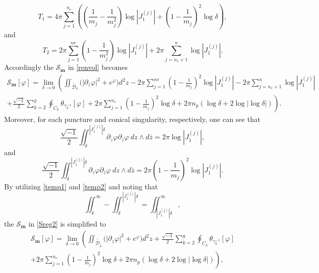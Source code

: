 \documentclass[a4paper,11pt]{article}
\newcommand{\singfund}{\overset{{}_{\curlywedge}}{\mathcal{D}}}
\begin{document}
\begin{equation}
T_1  = 4\pi \sum_{j=1}^{n_e} \left(   (\frac{1}{m_j}-\frac{1}{m_j^2}) \log \left|J_1^{(j)}\right|+   (1-\frac{1}{m_j})^2 \log \delta \right),
\label{bdterm}
\end{equation}
and
\begin{equation}
T_2 = 2\pi \sum_{j=1}^{ne} (1-\frac{1}{m_j^2}) \log\left|J_{1}^{(j)}\right| +2\pi \sum_{j=n_e+1}^{n} \log\left|J_{1}^{(j)}\right|.
\end{equation}
Accordingly the $\mathscr{S}_{\boldsymbol{m}} $ in \eqref{renvol} becomes
\begin{multline}
\mathscr{S}_{\boldsymbol{m}}[\varphi]  = \lim_{\delta \to 0} \left(\iint_{\singfund_{\delta}} \Big(
|\partial_z \varphi|^2 + e^\varphi
\Big) d^2z - 2\pi \sum_{j=1}^{ne} (1-\frac{1}{m_j})^2 \log\left|J_{1}^{(j)}\right| -2\pi \sum_{j=n_e+1}^{n} \log\left|J_{1}^{(j)}\right|\right. \\ \left. + \frac{\sqrt{-1}}{2} \sum_{k=2}^{g} \oint_{C_k} \theta_{\gamma_k^{-1}}[\varphi]+2\pi \sum_{j=1}^{n_e} (1-\frac{1}{m_j})^2 \log \delta + 2\pi n_p \left(
\log\delta + 2\log \left|\log \delta\right|
\right)\right).
\label{Sreg2}
\end{multline}
Moreover, for each puncture and conical singularity, respectively, one can see that
\begin{equation}
\frac{\sqrt{-1}}{2} \iint_{\delta}^{\left|J_{1}^{(j)}\right|\delta} \partial_z \varphi \partial_{\bar{z} }\varphi ~dz\wedge d\bar{z} = 2\pi \log\left|J_{1}^{(j)}\right|,
\label{temp1}
\end{equation}
and
\begin{equation}
\frac{\sqrt{-1}}{2} \iint_{\delta}^{\left|J_{1}^{(j)}\right|\delta} \partial_z \varphi \partial_{\bar{z}}  \varphi ~dz \wedge d\bar{z} =  2\pi (1-\frac{1}{m_j})^2 \log\left|J_{1}^{(j)}\right|.
\label{temp2}
\end{equation}
By utilizing \eqref{temp1} and \eqref{temp2} and noting that
\begin{equation} \iint_{\delta}^{\infty}  -\iint_{\delta}^{\left|J_{1}^{(j)}\right|\delta}=\iint_{\left|J_{1}^{(j)}\right|\delta}^{\infty},\nonumber
\end{equation}
the $\mathscr{S}_{\boldsymbol{m}}$ in \eqref{Sreg2} is simplified to
\begin{multline}
\mathscr{S}_{\boldsymbol{m}}[\varphi]  =\lim_{\delta \to 0} \left( \iint_{\singfund_{\tilde\delta}} \Big(
|\partial_z \varphi|^2 + e^\varphi
\Big) d^2z + \frac{\sqrt{-1}}{2} \sum_{k=2}^{g} \oint_{C_k} \theta_{\gamma_k^{-1}}[\varphi]\right. \\ \left. +2\pi \sum_{j=1}^{n_e} \left(1-\frac{1}{m_j}\right)^2 \log \delta + 2\pi n_p \left(
\log\delta + 2\log \left|\log \delta\right|
\right)\right),
\label{Sreg3}
\end{multline}
\end{document}
